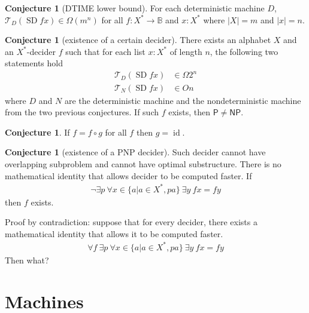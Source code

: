 \documentclass[10pt,statementpaper]{memoir}
\theoremstyle{definition}
\newcounter{thmctr}
\newtheorem{mcon}[thmctr]{Conjecture}
\newcommand\TC{\mathcal{T}}
\newcommand\id{\ensuremath{\operatorname{id}}}
\newcommand\PTIME{\ensuremath{\mathsf{P}}}
\newcommand\NPTIME{\ensuremath{\mathsf{NP}}}
\newcommand\SDP{\ensuremath{\operatorname{SD}}}
\begin{document}
\begin{mcon}[DTIME lower bound]
    For each deterministic machine $D$,
    $\TC_D(\SDP fx) \in \Omega(m^n)$ for all $f : X^* \to \mathbb B$
    and $x : X^*$
    where $|X| = m$
    and $|x| = n$.
\end{mcon}

\begin{mcon}[existence of a certain decider]
There exists an alphabet $X$
and an $X^*$-decider $f$ such that
for each list $x : X^*$ of length $n$,
the following two statements hold
\begin{align}
    \TC_D(\SDP fx) &\in \Omega 2^n
    \\
    \TC_N(\SDP fx) &\in O n
\end{align}
where $D$ and $N$ are the deterministic machine
and the nondeterministic machine from the two previous conjectures.
If such $f$ exists, then $\PTIME \neq \NPTIME$.
\end{mcon}

\begin{mcon}
    If $f = f \circ g$ for all $f$ then $g = \id$.
\end{mcon}

\begin{mcon}[existence of a PNP decider]
Such decider cannot have overlapping subproblem
and cannot have optimal substructure.
There is no mathematical identity that allows decider to be computed faster.
If
\begin{align}
    \neg\exists p ~ \forall x \in \{ a | a \in X^*, p a \} ~ \exists y ~ fx = fy
\end{align}
then $f$ exists.
\end{mcon}

Proof by contradiction:
suppose that for every decider,
there exists a mathematical identity that allows it to be computed faster.
\begin{align}
    \forall f ~ \exists p ~ \forall x \in \{ a | a \in X^*, p a \} ~ \exists y ~ fx = fy
\end{align}
Then what?

\chapter{Machines}
\end{document}
